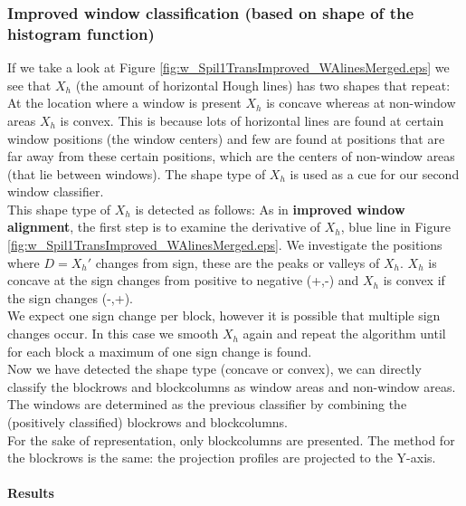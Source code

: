 \subsubsection{Improved window classification (based on shape of the histogram function)}
If we take a look at Figure \ref{fig:w_Spil1TransImproved_WAlinesMerged.eps}
we see that $X_h$ (the amount of horizontal Hough lines) has two shapes that
repeat:  At the location where a window is present $X_h$ is concave whereas at
non-window areas $X_h$ is convex. This is because lots of
horizontal lines are found at certain window positions (the window centers) and few
are found at positions that are far away from these certain positions, which are the
centers of non-window areas (that lie between windows).  The shape type of $X_h$ is
used as a cue for our second window classifier.\\

This shape type of $X_h$ is detected as follows:
As in \textbf{improved window alignment}, the first step is to examine the
derivative of $X_h$, blue line in Figure
\ref{fig:w_Spil1TransImproved_WAlinesMerged.eps}.  We investigate the positions
where $D=X_{h}'$ changes from sign, these are the peaks or valleys of $X_h$.
$X_h$ is concave at the sign changes from positive to negative (+,-) and $X_h$
is convex if the sign changes (-,+).\\

We expect one sign change per block, however it is possible that multiple sign
changes occur. In this case we smooth $X_h$ again and repeat the algorithm
until for each block a maximum of one sign change is found. \\

Now we have detected the shape type (concave or convex), we can directly
classify the blockrows and blockcolumns as window areas and non-window areas.
The windows are determined as the previous classifier by combining the
(positively classified) blockrows and blockcolumns.\\

For the sake of representation, only blockcolumns are presented. The method for
the blockrows is the same: the projection profiles are projected to the
Y-axis.

\newpage
\paragraph{Results} %

